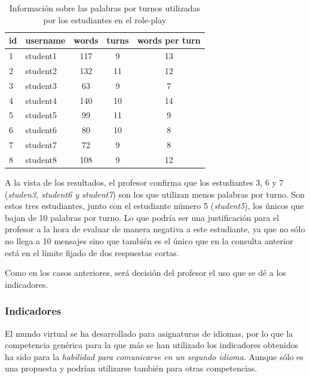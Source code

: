 \begin{table}
	\centering
	\caption{Información sobre las palabras por turnos utilizadas por los estudiantes en el role-play}
	\label{tab:EvsListEj2}
	\begin{tabular}{|l|l|c|c|c|}
		\hline
		id & username & words & turns & words per turn \\
		\hline
		\hline
		1 & student1 & 117 & 9 & 13 \\
		\hline
		2 & student2 & 132 & 11 & 12  \\
		\hline
		3 & student3 & 63 & 9 & 7  \\
		\hline
		4 & student4 & 140 & 10 & 14  \\
		\hline
		5 & student5 & 99  & 11 & 9 \\
		\hline
		6 & student6 & 80 & 10 & 8  \\
		\hline
		7 & student7 & 72 & 9 & 8  \\
		\hline
		8 & student8 & 108 & 9 & 12   \\
		\hline
	\end{tabular}
\end{table}

A la vista de los resultados, el profesor confirma que los estudiantes 3, 6 y 7 (\emph{studen3, student6 y student7}) son los que utilizan menos palabras por turno. Son estos tres estudiantes, junto con el estudiante número 5 (\emph{student5}), los únicos que bajan de 10 palabras por turno. Lo que podría ser una justificación para el profesor a la hora de evaluar de manera negativa a este estudiante, ya que no sólo no llega a 10 mensajes sino que también es el único que en la consulta anterior está en el límite fijado de dos respuestas cortas.

Como en los casos anteriores, será decisión del profesor el uso que se dé a los indicadores.

\subsubsection{Indicadores}

El mundo virtual se ha desarrollado para asignaturas de idiomas, por lo que la competencia genérica para la que más se han utilizado los indicadores obtenidos ha sido para la \emph{habilidad para comunicarse en un segundo idioma}. Aunque sólo es una propuesta y podrían utilizarse también para otras competencias.


